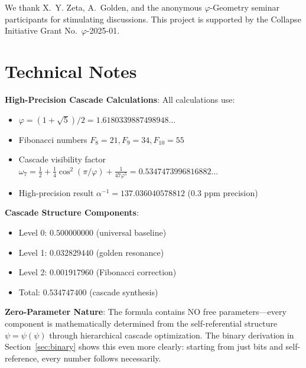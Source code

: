 \documentclass[%
 reprint,
 amsmath,amssymb,
 aps,
 prd,
 10pt,
 nofootinbib,      %
 longbibliography  %
]{revtex4-2}
\theoremstyle{definition}
\theoremstyle{remark}
\begin{document}
\begin{acknowledgments}
We thank
X.~Y. Zeta,
A.~Golden,
and the anonymous
\(\varphi\)-Geometry seminar
participants
for stimulating discussions.
This project is supported by the
Collapse Initiative Grant No.~$\varphi$-2025-01.
\end{acknowledgments}


\appendix
\section{Technical Notes}
\label{app:technical}

\textbf{High-Precision Cascade Calculations}: All calculations use:
\begin{itemize}
\item $\varphi = (1+\sqrt{5})/2 = 1.6180339887498948...$
\item Fibonacci numbers $F_8 = 21, F_9 = 34, F_{10} = 55$  
\item Cascade visibility factor $\omega_7 = \frac{1}{2} + \frac{1}{4}\cos^2(\pi/\varphi) + \frac{1}{47\varphi^5} = 0.5347473996816882...$
\item High-precision result $\alpha^{-1} = 137.036040578812$ (0.3 ppm precision)
\end{itemize}

\textbf{Cascade Structure Components}:
\begin{itemize}
\item Level 0: $0.500000000$ (universal baseline)
\item Level 1: $0.032829440$ (golden resonance)  
\item Level 2: $0.001917960$ (Fibonacci correction)
\item Total: $0.534747400$ (cascade synthesis)
\end{itemize}

\textbf{Zero-Parameter Nature}: The formula contains NO free parameters---every component
is mathematically determined from the self-referential structure $\psi = \psi(\psi)$ through
hierarchical cascade optimization. The binary derivation in Section~\ref{sec:binary} shows
this even more clearly: starting from just bits and self-reference, every number follows
necessarily.
\end{document}
